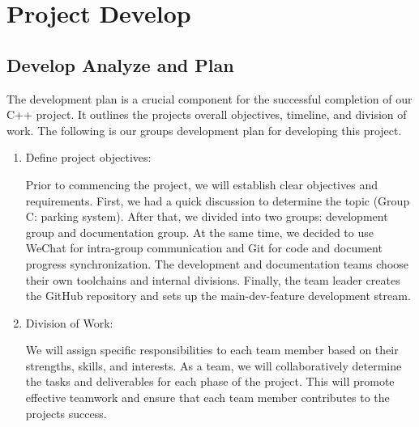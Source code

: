 \pagestyle{fancy}
\fancyhead[L]{}
\renewcommand{\headrulewidth}{2pt}
\renewcommand{\baselinestretch}{1.5}
\setcounter{page}{2} 
{\rmfamily\selectfont
\vspace{-1ex}

\hypertarget{project-develop}{%
\section{Project Develop}\label{project-develop}}

\hypertarget{develop-analyze-and-plan}{%
\subsection{Develop Analyze and Plan}\label{develop-analyze-and-plan}}

The development plan is a crucial component for the successful
completion of our C++ project. It outlines the project\textquotesingle s
overall objectives, timeline, and division of work. The following is our
group\textquotesingle s development plan for developing this project.

\begin{enumerate}
\def\labelenumi{\arabic{enumi}.}
\item
  Define project objectives:

  Prior to commencing the project, we will establish clear objectives
  and requirements. First, we had a quick discussion to determine the
  topic (Group C: parking system). After that, we divided into two
  groups: development group and documentation group. At the same time,
  we decided to use WeChat for intra-group communication and Git for
  code and document progress synchronization. The development and
  documentation teams choose their own toolchains and internal
  divisions. Finally, the team leader creates the GitHub repository and
  sets up the main-dev-feature development stream.
\item
  Division of Work:

  We will assign specific responsibilities to each team member based on
  their strengths, skills, and interests. As a team, we will
  collaboratively determine the tasks and deliverables for each phase of
  the project. This will promote effective teamwork and ensure that each
  team member contributes to the project\textquotesingle s success.


\end{enumerate}}
